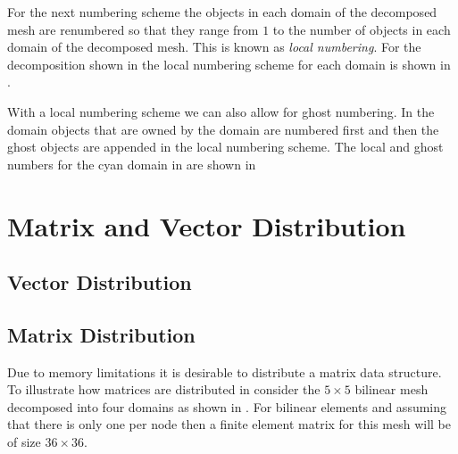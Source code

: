 For the next numbering scheme the objects in each domain of the decomposed mesh are renumbered so that they range from $1$ to the number of objects in each domain of the decomposed mesh. This is known as \emph{local numbering}. For the decomposition shown in  the local numbering scheme for each domain is shown in .


With a local numbering scheme we can also allow for ghost numbering. In \OpenCMISS the domain objects that are owned by the domain are numbered first and then the ghost objects are appended in the local numbering scheme. The local and ghost numbers for the cyan domain in  are shown in 


\section{Matrix and Vector Distribution}
\label{sec:MatrixVectorDistribution}

\subsection{Vector Distribution}
\label{sec:VectorDistribution}

\subsection{Matrix Distribution}
\label{sec:MatrixDistribution}

Due to memory limitations it is desirable to distribute a matrix data structure. To illustrate how matrices are distributed in \OpenCMISS consider the $5\times 5$ bilinear mesh decomposed into four domains as shown in . For bilinear elements and assuming that there is only one \DoF per node then a finite element matrix for this mesh will be of size $36\times 36$.

